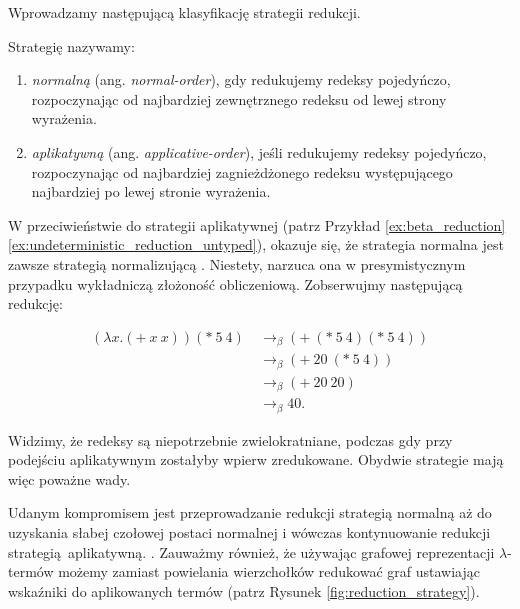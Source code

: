 Wprowadzamy następującą klasyfikację strategii redukcji.

\begin{definicja}
Strategię nazywamy:
\begin{enumerate}
\item \emph{normalną} (ang. \emph{normal-order}), gdy redukujemy redeksy pojedyńczo, rozpoczynając od najbardziej zewnętrznego redeksu od lewej strony wyrażenia.
\item \emph{aplikatywną} (ang. \emph{applicative-order}), jeśli redukujemy redeksy pojedyńczo, rozpoczynając od najbardziej zagnieżdżonego redeksu występującego najbardziej po lewej stronie wyrażenia.
\end{enumerate}
\end{definicja}

W przeciwieństwie do strategii aplikatywnej (patrz Przykład \ref{ex:beta_reduction}\ref{ex:undeterministic_reduction_untyped}), okazuje się, że strategia normalna jest zawsze strategią normalizującą \cite[Rozdział 1.5]{Urzyczyn2006}. Niestety, narzuca ona w presymistycznym przypadku wykładniczą złożoność obliczeniową. Zobserwujmy następującą redukcję:

\begin{align*}
  \left(\lambda x.(+\ x\ x)\right)(*\ 5\ 4)\ &\to_\beta (+\ (*\ 5\ 4)(*\ 5\ 4))\tag{\(\blacktriangledown\)}\label{ex:normal_reduction}\\
  &\to_\beta (+\ 20\ (*\ 5\ 4))\\
  &\to_\beta (+\ 20\ 20)\\
  &\to_\beta 40.
\end{align*}

Widzimy, że redeksy są niepotrzebnie zwielokratniane, podczas gdy przy podejściu aplikatywnym zostałyby wpierw zredukowane. Obydwie strategie mają więc poważne wady.

Udanym kompromisem jest przeprowadzanie redukcji strategią normalną aż do uzyskania słabej czołowej postaci normalnej i wówczas kontynuowanie redukcji strategią aplikatywną. \cite[Rozdział 11.3]{PeytonJones:1987:IFP:1096899}. Zauważmy również, że używając grafowej reprezentacji \(\lambda\)-termów możemy zamiast powielania wierzchołków redukować graf ustawiając wskaźniki do aplikowanych termów (patrz Rysunek \ref{fig:reduction_strategy}). 

